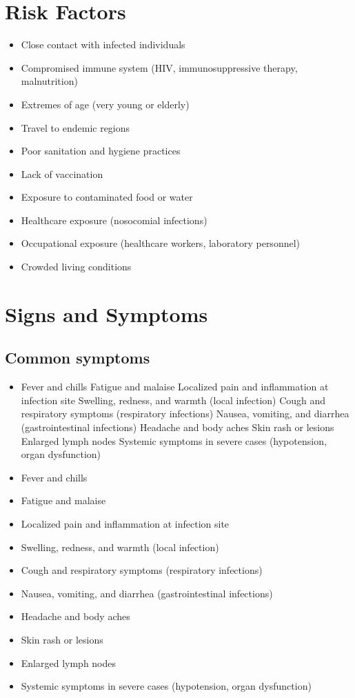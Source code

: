 \section{Risk Factors}

\begin{itemize}[noitemsep]
  \item Close contact with infected individuals
  \item Compromised immune system (HIV, immunosuppressive therapy, malnutrition)
  \item Extremes of age (very young or elderly)
  \item Travel to endemic regions
  \item Poor sanitation and hygiene practices
  \item Lack of vaccination
  \item Exposure to contaminated food or water
  \item Healthcare exposure (nosocomial infections)
  \item Occupational exposure (healthcare workers, laboratory personnel)
  \item Crowded living conditions
\end{itemize}
\section{Signs and Symptoms}

\subsection{Common symptoms}
\begin{itemize}[noitemsep]
  \item Fever and chills Fatigue and malaise Localized pain and inflammation at infection site Swelling, redness, and warmth (local infection) Cough and respiratory symptoms (respiratory infections) Nausea, vomiting, and diarrhea (gastrointestinal infections) Headache and body aches Skin rash or lesions Enlarged lymph nodes Systemic symptoms in severe cases (hypotension, organ dysfunction)
  \item Fever and chills
  \item Fatigue and malaise
  \item Localized pain and inflammation at infection site
  \item Swelling, redness, and warmth (local infection)
  \item Cough and respiratory symptoms (respiratory infections)
  \item Nausea, vomiting, and diarrhea (gastrointestinal infections)
  \item Headache and body aches
  \item Skin rash or lesions
  \item Enlarged lymph nodes
  \item Systemic symptoms in severe cases (hypotension, organ dysfunction)
\end{itemize}

